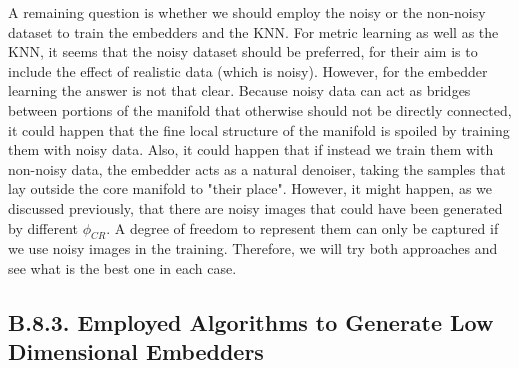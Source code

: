 \documentclass[11pt, a4paper, twoside]{article} %
\begin{document}
 A remaining question is whether we should employ the noisy or the non-noisy dataset to train the embedders and the KNN. For metric learning as well as the KNN, it seems that the noisy dataset should be preferred, for their aim is to include the effect of realistic data (which is noisy). However, for the embedder learning the answer is not that clear. Because noisy data can act as bridges between portions of the manifold that otherwise should not be directly connected, it could happen that the fine local structure of the manifold is spoiled by training them with noisy data. Also, it could happen that if instead we train them with non-noisy data, the embedder acts as a natural denoiser, taking the samples that lay outside the core manifold to "their place". However, it might happen, as we discussed previously, that there are noisy images that could have been generated by different $\phi_{CR}$. A degree of freedom to represent them can only be captured if we use noisy images in the training. Therefore, we will try both approaches and see what is the best one in each case. 
\vspace{-0.5cm}


\subsection*{B.8.3. Employed Algorithms to Generate Low Dimensional Embedders}
\end{document}
